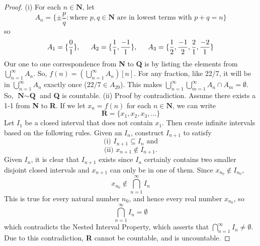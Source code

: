             \begin{proof}
                (i) For each $n \in \textbf{N}$, let
                \begin{equation*}
                    A_n = \{\pm \frac{p}{q}: \text{where } p, q \in \textbf{N} \text{ are in lowest terms with } p + q = n\}
                \end{equation*}
                so
                \begin{equation*}
                    A_1 = \{\frac{0}{1}\},\indent
                    A_2 = \{\frac{1}{1}, \frac{-1}{1}\}, \indent
                    A_3 = \{\frac{1}{2}, \frac{-1}{2}, \frac{2}{1}, \frac{-2}{1}\}
                \end{equation*}
                Our one to one correspondence from \textbf{N} to \textbf{Q} is by listing the elements from $\bigcup_{n=1}^{\infty} A_n$. So, $f(n) = (\bigcup_{n=1}^{\infty} A_n)[n]$. For any fraction, like 22/7, it will be in $\bigcup_{n=1}^{\infty} A_n$ exactly once ($22/7 \in A_29$). This makes $\bigcup_{n=1}^{\infty}\bigcup_{m=1}^{\infty} A_n \cap A_m = \emptyset$. So, $\textbf{N} \sim \textbf{Q}$ and \textbf{Q} is countable.
                \newline \indent
                (ii) Proof by contradiction. Assume there exists a 1-1 from \textbf{N} to \textbf{R}. If we let $x_n = f(n)$ for each $n \in \textbf{N}$, we can write
                \begin{equation*}
                    \textbf{R} = \{x_1, x_2, x_3, \dots \}
                \end{equation*}
                Let $I_1$ be a closed interval that does not contain $x_1$. Then create infinite intervals based on the following rules. Given an $I_n$, construct $I_{n+1}$ to satisfy
                \begin{equation*}
                    \text{(i) } I_{n+1} \subseteq I_n \text{ and}
                \end{equation*}
                \begin{equation*}
                    \text{(ii) } x_{n+1} \notin I_{n+1}.
                \end{equation*}
                Given $I_n$, it is clear that $I_{n+1}$ exists since $I_n$ certainly contains two smaller disjoint closed intervals and $x_{n+1}$ can only be in one of them. Since $x_{n_0} \notin I_{n_0}$,
                \begin{equation*}
                    x_{n_0} \notin \bigcap_{n=1}^{\infty} I_n
                \end{equation*}
                This is true for every natural number $n_0$, and hence every real number $x_{n_0}$, so
                \begin{equation*}
                    \bigcap_{n=1}^{\infty} I_n = \emptyset
                \end{equation*}
                which contradicts the Nested Interval Property, which asserts that $\bigcap_{n=1}^{\infty} I_n \neq \emptyset$. Due to this contradiction, \textbf{R} cannot be countable, and is uncountable.
            \end{proof}

